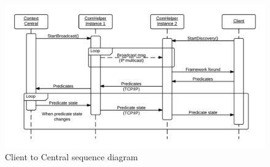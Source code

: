 \documentclass[../report.tex]{subfiles}
\begin{document}
\begin{figure}[h]
\centering
\includegraphics[width=\linewidth]{comHelperSequence-client.png}
\caption{Client to Central sequence diagram}
\label{fig:clientComHelper}
\end{figure}
\end{document}
